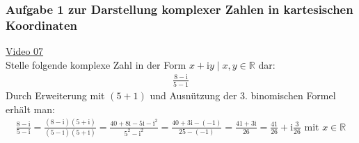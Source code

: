 \subsubsection{Aufgabe 1 zur Darstellung komplexer Zahlen in kartesischen Koordinaten}
\href{https://youtu.be/FL3zN9eSh_c}{Video 07}\\
Stelle folgende komplexe Zahl in der Form $ x+\mathrm{i}y\; |\; x,y \in \mathbb{R}$ dar:\\
\begin{align*}
\frac{8-\mathrm{i}}{5-1}
\end{align*}
Durch Erweiterung mit $ (5+1) $ und Ausnützung der 3. binomischen Formel erhält man:\\
\begin{align*}
\frac{8-\mathrm{i}}{5-\mathrm{i}}=\frac{(8-\mathrm{i})(5+\mathrm{i})}{(5-\mathrm{i})(5+\mathrm{i})}=\frac{40+8\mathrm{i}-5\mathrm{i}-\mathrm{i}^2}{5^2-\mathrm{i}^2}=\frac{40+3\mathrm{i}-(-1)}{25-(-1)}=\frac{41+3\mathrm{i}}{26}=\frac{41}{26}+\mathrm{i}\frac{3}{26} \text{ mit }x \in \mathbb{R}
\end{align*}
